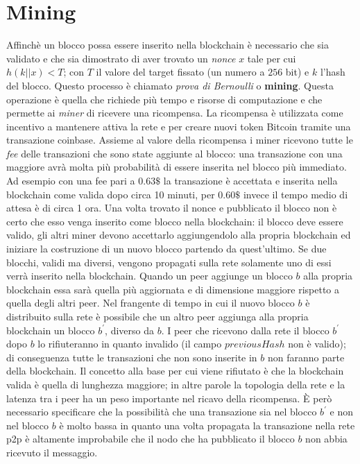 \section{Mining}
Affinchè un blocco possa essere inserito nella blockchain è necessario che sia validato e che sia dimostrato di aver trovato un \textit{nonce} $x$ tale per cui $h(k||x)<T$; con $T$ il valore del target fissato (un numero a $256$ bit) e $k$ l'hash del blocco. Questo processo è chiamato \textit{prova di Bernoulli} o \textbf{mining}.\newline
Questa operazione è quella che richiede più tempo e risorse di computazione e che permette ai \textit{miner} di ricevere una ricompensa.\newline
La ricompensa è utilizzata come incentivo a mantenere attiva la rete e per creare nuovi token Bitcoin tramite una transazione coinbase. Assieme al valore della ricompensa i miner ricevono tutte le \textit{fee} delle transazioni che sono state aggiunte al blocco: una transazione con una  maggiore avrà molta più probabilità di essere inserita nel blocco più immediato. Ad esempio con una fee pari a $0.63\$$ la transazione è accettata e inserita nella blockchain come valida dopo circa 10 minuti, per $0.60\$$ invece il tempo medio di attesa è di circa 1 ora.\newline
Una volta trovato il nonce e pubblicato il blocco non è certo che esso venga inserito come blocco nella blockchain: il blocco deve essere valido, gli altri miner devono accettarlo aggiungendolo alla propria blockchain ed iniziare la costruzione di un nuovo blocco partendo da quest'ultimo. Se due blocchi, validi ma diversi, vengono propagati sulla rete solamente uno di essi verrà inserito nella blockchain. Quando un peer aggiunge un blocco $b$ alla propria blockchain essa sarà quella più aggiornata e di dimensione maggiore rispetto a quella degli altri peer. Nel frangente di tempo in cui il nuovo blocco $b$ è distribuito sulla rete è possibile che un altro peer aggiunga alla propria blockchain un blocco $b^{'}$, diverso da $b$. I peer che ricevono dalla rete il blocco $b^{'}$ dopo $b$ lo rifiuteranno in quanto invalido (il campo $previousHash$ non è valido); di conseguenza tutte le transazioni che non sono inserite in $b$ non faranno parte della blockchain. Il concetto alla base per cui viene rifiutato è che la blockchain valida è quella di lunghezza maggiore; in altre parole la topologia della rete e la latenza tra i peer ha un peso importante nel ricavo della ricompensa. È però necessario specificare che la possibilità che una transazione sia nel blocco $b^{'}$ e non nel blocco $b$ è molto bassa in quanto una volta propagata la transazione nella rete p2p è altamente improbabile che il nodo che ha pubblicato il blocco $b$ non abbia ricevuto il messaggio.\newline
